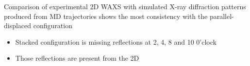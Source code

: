 \documentclass{article}
\begin{document}
\begin{itemize}
\begin{itemize}
	Comparison of experimental 2D WAXS with simulated X-ray diffraction patterns produced from MD trajectories shows the most consistency with the parallel-displaced configuration
	\begin{itemize} 
		\item Stacked configuration is missing reflections at 2, 4, 8 and 10 0'clock
		\item Those reflections are present from the 2D 

 

\end{itemize}
\end{itemize}
\end{itemize}
\end{document}
